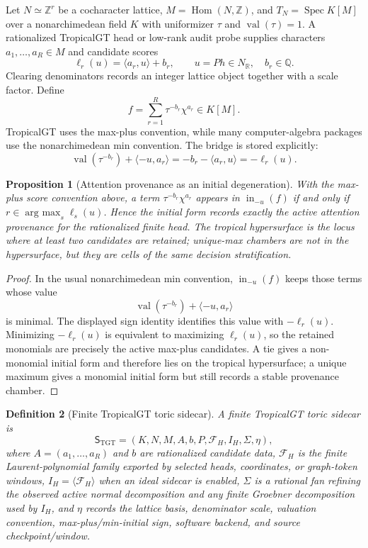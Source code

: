 \documentclass[11pt]{article}
\newtheorem{definition}{Definition}[section]
\newtheorem{proposition}[definition]{Proposition}
\newcommand{\argmax}{\operatorname*{arg\ max}}
\begin{document}
Let $N\simeq \mathbb Z^r$ be a cocharacter lattice, $M=\operatorname{Hom}(N,\mathbb Z)$, and $T_N=\operatorname{Spec}K[M]$ over a nonarchimedean field $K$ with uniformizer $\tau$ and $\operatorname{val}(\tau)=1$.  A rationalized TropicalGT head or low-rank audit probe supplies characters $a_1,\ldots,a_R\in M$ and candidate scores
\[
  \ell_r(u)=\langle a_r,u\rangle+b_r,\qquad u=P h\in N_\mathbb R,\quad b_r\in\mathbb Q.
\]
Clearing denominators records an integer lattice object together with a scale factor.  Define
\[
  f=\sum_{r=1}^R \tau^{-b_r}\chi^{a_r}\in K[M].
\]
TropicalGT uses the max-plus convention, while many computer-algebra packages use the nonarchimedean min convention.  The bridge is stored explicitly:
\[
  \operatorname{val}(\tau^{-b_r})+\langle -u,a_r\rangle
  =-b_r-\langle a_r,u\rangle
  =-\ell_r(u).
\]
\begin{proposition}[Attention provenance as an initial degeneration]
\label{prop:attention-provenance-initial-degeneration}
With the max-plus score convention above, a term $\tau^{-b_r}\chi^{a_r}$ appears in $\operatorname{in}_{-u}(f)$ if and only if $r\in\argmax_s\ell_s(u)$.  Hence the initial form records exactly the active attention provenance for the rationalized finite head.  The tropical hypersurface is the locus where at least two candidates are retained; unique-max chambers are not in the hypersurface, but they are cells of the same decision stratification.
\end{proposition}
\begin{proof}
In the usual nonarchimedean min convention, $\operatorname{in}_{-u}(f)$ keeps those terms whose value
\[
  \operatorname{val}(\tau^{-b_r})+\langle -u,a_r\rangle
\]
is minimal.  The displayed sign identity identifies this value with $-\ell_r(u)$.  Minimizing $-\ell_r(u)$ is equivalent to maximizing $\ell_r(u)$, so the retained monomials are precisely the active max-plus candidates.  A tie gives a non-monomial initial form and therefore lies on the tropical hypersurface; a unique maximum gives a monomial initial form but still records a stable provenance chamber.
\end{proof}

\begin{definition}[Finite TropicalGT toric sidecar]
A finite TropicalGT toric sidecar is
\[
  \mathsf S_{\mathrm{TGT}}=(K,N,M,A,b,P,\mathcal F_H,I_H,\Sigma,\eta),
\]
where $A=(a_1,\ldots,a_R)$ and $b$ are rationalized candidate data, $\mathcal F_H$ is the finite Laurent-polynomial family exported by selected heads, coordinates, or graph-token windows, $I_H=\langle\mathcal F_H\rangle$ when an ideal sidecar is enabled, $\Sigma$ is a rational fan refining the observed active normal decomposition and any finite Groebner decomposition used by $I_H$, and $\eta$ records the lattice basis, denominator scale, valuation convention, max-plus/min-initial sign, software backend, and source checkpoint/window.
\end{definition}
\end{document}
